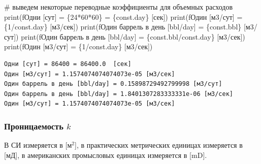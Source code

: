 \documentclass[
  russian,
  letterpaper,
  DIV=11,
  numbers=noendperiod,
  oneside]{scrartcl}
\newenvironment{Shaded}{\begin{snugshade}}{\end{snugshade}}
\newcommand{\BuiltInTok}[1]{\textcolor[rgb]{0.00,0.23,0.31}{#1}}
\newcommand{\CommentTok}[1]{\textcolor[rgb]{0.37,0.37,0.37}{#1}}
\newcommand{\DecValTok}[1]{\textcolor[rgb]{0.68,0.00,0.00}{#1}}
\newcommand{\NormalTok}[1]{\textcolor[rgb]{0.00,0.23,0.31}{#1}}
\newcommand{\OperatorTok}[1]{\textcolor[rgb]{0.37,0.37,0.37}{#1}}
\newcommand{\SpecialCharTok}[1]{\textcolor[rgb]{0.37,0.37,0.37}{#1}}
\newcommand{\SpecialStringTok}[1]{\textcolor[rgb]{0.13,0.47,0.30}{#1}}
\begin{document}
\begin{Shaded}
\begin{Highlighting}[]
\CommentTok{\# выведем некоторые переводные коэффициенты для объемных расходов}
\BuiltInTok{print}\NormalTok{(}\SpecialStringTok{f\textquotesingle{}Одни [сут] = }\SpecialCharTok{\{}\DecValTok{24}\OperatorTok{*}\DecValTok{60}\OperatorTok{*}\DecValTok{60}\SpecialCharTok{\}}\SpecialStringTok{ = }\SpecialCharTok{\{}\NormalTok{const}\SpecialCharTok{.}\NormalTok{day}\SpecialCharTok{\}}\SpecialStringTok{  [сек]\textquotesingle{}}\NormalTok{)}
\BuiltInTok{print}\NormalTok{(}\SpecialStringTok{f\textquotesingle{}Один [м3/сут] = }\SpecialCharTok{\{}\DecValTok{1}\OperatorTok{/}\NormalTok{const}\SpecialCharTok{.}\NormalTok{day}\SpecialCharTok{\}}\SpecialStringTok{ [м3/сек]\textquotesingle{}}\NormalTok{)}
\BuiltInTok{print}\NormalTok{(}\SpecialStringTok{f\textquotesingle{}Один баррель в день [bbl/day] = }\SpecialCharTok{\{}\NormalTok{const}\SpecialCharTok{.}\NormalTok{bbl}\SpecialCharTok{\}}\SpecialStringTok{ [м3/сут]\textquotesingle{}}\NormalTok{)}
\BuiltInTok{print}\NormalTok{(}\SpecialStringTok{f\textquotesingle{}Один баррель в день [bbl/day] = }\SpecialCharTok{\{}\NormalTok{const}\SpecialCharTok{.}\NormalTok{bbl}\OperatorTok{/}\NormalTok{const}\SpecialCharTok{.}\NormalTok{day}\SpecialCharTok{\}}\SpecialStringTok{ [м3/сек]\textquotesingle{}}\NormalTok{)}
\BuiltInTok{print}\NormalTok{(}\SpecialStringTok{f\textquotesingle{}Один [м3/сут] = }\SpecialCharTok{\{}\DecValTok{1}\OperatorTok{/}\NormalTok{const}\SpecialCharTok{.}\NormalTok{day}\SpecialCharTok{\}}\SpecialStringTok{ [м3/сек]\textquotesingle{}}\NormalTok{)}
\end{Highlighting}
\end{Shaded}

\begin{verbatim}
Одни [сут] = 86400 = 86400.0  [сек]
Один [м3/сут] = 1.1574074074074073e-05 [м3/сек]
Один баррель в день [bbl/day] = 0.15898729492799998 [м3/сут]
Один баррель в день [bbl/day] = 1.8401307283333331e-06 [м3/сек]
Один [м3/сут] = 1.1574074074074073e-05 [м3/сек]
\end{verbatim}

\subsubsection{\texorpdfstring{Проницаемость
\(k\)}{Проницаемость k}}\label{ux43fux440ux43eux43dux438ux446ux430ux435ux43cux43eux441ux442ux44c-k}

В СИ измеряется в {[}м\(^2\){]}, в практических метрических единицах
измеряется в {[}мД{]}, в американских промысловых единицах измеряется в
{[}mD{]}.
\end{document}
